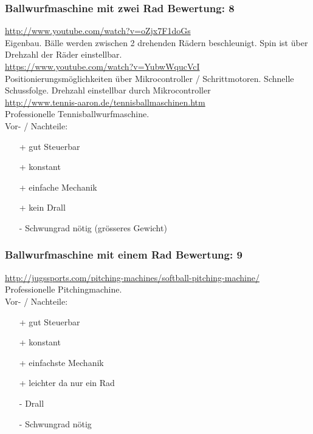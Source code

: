 \subsubsection{Ballwurfmaschine mit zwei Rad \hfill Bewertung: 8}
\url{http://www.youtube.com/watch?v=oZjx7F1doGs} \\
Eigenbau. Bälle werden zwischen 2 drehenden Rädern beschleunigt. Spin ist über 
Drehzahl der Räder einstellbar. \\
\url{https://www.youtube.com/watch?v=YubwWqucVcI} \\
Positionierungsmöglichkeiten über Mikrocontroller / Schrittmotoren. Schnelle 
Schussfolge. Drehzahl einstellbar durch Mikrocontroller \\
\url{http://www.tennis-aaron.de/tennisballmaschinen.htm} \\
Professionelle Tennisballwurfmaschine. \\
Vor- / Nachteile:
\begin{itemize}
    \item[+] gut Steuerbar
    \item[+] konstant
    \item[+] einfache Mechanik
    \item[+] kein Drall
    \item[-] Schwungrad nötig (grösseres Gewicht)
\end{itemize}

\subsubsection{Ballwurfmaschine mit einem Rad \hfill Bewertung: 9}
\url{http://jugssports.com/pitching-machines/softball-pitching-machine/} \\
Professionelle Pitchingmachine. \\
Vor- / Nachteile:
\begin{itemize}
    \item[+] gut Steuerbar
    \item[+] konstant
    \item[+] einfachste Mechanik
    \item[+] leichter da nur ein Rad
    \item[-] Drall
    \item[-] Schwungrad nötig
\end{itemize}

